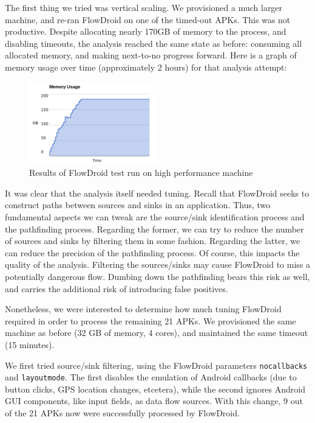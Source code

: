 The first thing we tried was vertical scaling.  We provisioned a much larger machine, and re-ran FlowDroid on one of the timed-out APKs.  This was not productive.  Despite allocating nearly 170GB of memory to the process, and disabling timeouts, the analysis reached the same state as before: consuming all allocated memory, and making next-to-no progress forward.  Here is a graph of memory usage over time (approximately 2 hours) for that analysis attempt:

\begin{figure}[h]
	\centering
	\includegraphics[width=0.50\textwidth]{flowdroid_perf.pdf}
	\caption{Results of FlowDroid test run on high performance machine}
	\label{fig:high_phase1}
\end{figure}

It was clear that the analysis itself needed tuning.  Recall that FlowDroid seeks to construct paths between sources and sinks in an application.  Thus, two fundamental aspects we can tweak are the source/sink identification process and the pathfinding process.  Regarding the former, we can try to reduce the number of sources and sinks by filtering them in some fashion.  Regarding the latter, we can reduce the precision of the pathfinding process.  Of course, this impacts the quality of the analysis.  Filtering the sources/sinks may cause FlowDroid to miss a potentially dangerous flow.  Dumbing down the pathfinding bears this risk as well, and carries the additional risk of introducing false positives. 

Nonetheless, we were interested to determine how much tuning FlowDroid required in order to process the remaining 21 APKs.  We provisioned the same machine as before (32 GB of memory, 4 cores), and maintained the same timeout (15 minutes).  

We first tried source/sink filtering, using the FlowDroid parameters \texttt{nocallbacks} and \texttt{layoutmode}.  The first disables the emulation of Android callbacks (due to button clicks, GPS location changes, etcetera), while the second ignores Android GUI components, like input fields, as data flow sources.  With this change, 9 out of the 21 APKs now were successfully processed by FlowDroid. 

